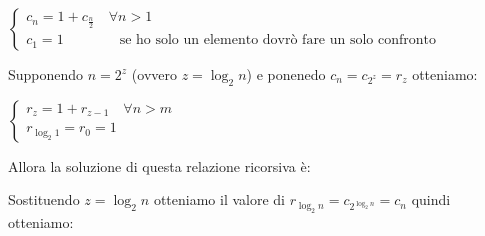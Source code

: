 \begin{flushleft}
\begin{boxA}
        {\centering
            $\begin{cases}
                c_n = 1 + c_{\frac{n}{2}} \quad \forall n > 1 \\
                c_1 = 1 \qquad \qquad \text{se ho solo un elemento dovrò fare un solo confronto}
            \end{cases}$
        \par}
        Supponendo $n = 2^z$ (ovvero $z = \log_2 n$) e ponenedo $c_n = c_{2^z} = r_z$ otteniamo:

        {\centering
            $\begin{cases}
                r_z = 1 + r_{z-1} \quad \forall n > m \\
                r_{\log_2 1} = r_0 = 1
            \end{cases}$
        \par}
        Allora la soluzione di questa relazione ricorsiva è: 
        
        {\centering
        \par}
        Sostituendo $z = \log_2 n$ otteniamo il valore di $r_{\log_2 n} = c_{2^{\log_2 n}} = c_n$ quindi otteniamo: 
        
        {\centering
        \par}
        
    \end{boxA}
\end{flushleft}


